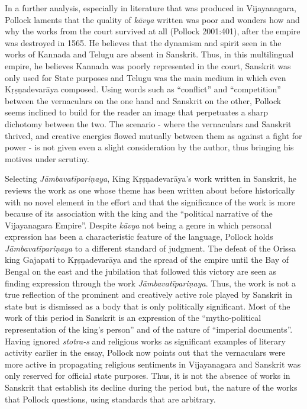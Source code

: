In a further analysis, especially in literature that was produced in Vijayanagara, Pollock laments that the quality of {\sl kāvya} written was poor and wonders how and why the works from the court survived at all (Pollock 2001:401), after the empire was destroyed in 1565. He believes that the dynamism and spirit seen in the works of Kannada and Telugu are absent in Sanskrit. Thus, in this multilingual empire, he believes Kannada was poorly represented in the court, Sanskrit was only used for State purposes and Telugu was the main medium in which even Kṛṣṇadevarāya composed. Using words such as “conflict” and “competition” between the vernaculars on the one hand and Sanskrit on the other, Pollock seems inclined to build for the reader an image that perpetuates a sharp dichotomy between the two. The scenario - where the vernaculars and Sanskrit thrived, and creative energies flowed mutually between them as against a fight for power - is not given even a slight consideration by the author, thus bringing his motives under scrutiny. 

Selecting {\sl Jāmbavatīpariṇaya}, King Kṛṣṇadevarāya’s work written in Sanskrit, he reviews the work as one whose theme has been written about before historically with no novel element in the effort and that the significance of the work is more because of its association with the king and the “political narrative of the Vijayanagara Empire”. Despite {\sl kāvya} not being a genre in which personal expression has been a characteristic feature of the language, Pollock holds {\sl Jāmbavatīpariṇaya} to a different standard of judgment. The defeat of the Orissa king Gajapati to Kṛṣṇadevarāya and the spread of the empire until the Bay of Bengal on the east and the jubilation that followed this victory are seen as finding expression through the work {\sl Jāmbavatīpariṇaya}. Thus, the work is not a true reflection of the prominent and creatively active role played by Sanskrit in state but is dismissed as a body that is only politically significant. Most of the work of this period in Sanskrit is an expression of the “mytho-political representation of the king’s person” and of the nature of “imperial documents”. Having ignored {\sl stotra-s} and religious works as significant examples of literary activity earlier in the essay, Pollock now points out that the vernaculars were more active in propagating religious sentiments in Vijayanagara and Sanskrit was only reserved for official state purposes. Thus, it is not the absence of works in Sanskrit that establish its decline during the period but, the nature of the works that Pollock questions, using standards that are arbitrary.

